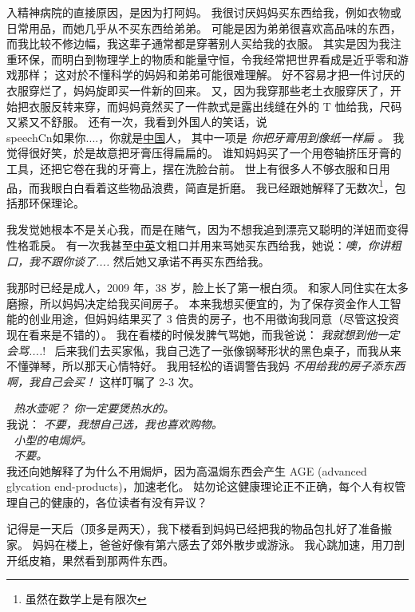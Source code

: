 \documentclass[12pt]{report}
\newcommand{\cc}[2]{#1}
\newcommand{\cc}[2]{#2}
\newcommand{\tab}{\hspace*{1cm}}
\newcommand{\speechCn}[1]{\textrm{\textit{\textcolor{Speech}{#1}}}}
\newcommand*\dashh{\,\,\textemdash\kern-1pt\textemdash\,\,}
\begin{document}
\cc{
入精神病院的直接原因，是因为打阿妈。 我很讨厌妈妈买东西给我，例如衣物或日常用品，而她几乎从不买东西给弟弟。 可能是因为弟弟很喜欢高品味的东西，而我比较不修边幅，我这辈子通常都是穿著别人买给我的衣服。 其实是因为我注重环保，而明白到物理学上的物质和能量守恒，令我经常把世界看成是近乎零和游戏那样； 这对於不懂科学的妈妈和弟弟可能很难理解。 好不容易才把一件讨厌的衣服穿烂了，妈妈旋即买一件新的回来。 又，因为我穿那些老土衣服穿厌了，开始把衣服反转来穿，而妈妈竟然买了一件款式是露出线缝在外的 T 恤给我，尺码又紧又不舒服。 还有一次，我看到外国人的笑话，说 \\speechCn{如果你....，你就是\uline{中国}人}， 其中一项是 \speechCn{你把牙膏用到像纸一样扁 。}  我觉得很好笑，於是故意把牙膏压得扁扁的。 谁知妈妈买了一个用卷轴挤压牙膏的工具，还把它卷在我的牙膏上，摆在洗脸台前。 世上有很多人不够衣服和日用品，而我眼白白看着这些物品浪费，简直是折磨。 我已经跟她解释了无数次\footnote{虽然在数学上是有限次}，包括那环保理论。
}{
	
}

\cc{
我发觉她根本不是关心我，而是在赌气，因为不想我追到漂亮又聪明的洋妞而变得性格乖戾。 有一次我甚至\uline{中英}文粗口并用来骂她买东西给我，她说：\speechCn{噢，你讲粗口，我不跟你谈了....} 然后她又承诺不再买东西给我。
}{
	
}

\cc{
我那时已经是成人，2009 年，38 岁，脸上长了第一根白须。 和家人同住实在太多磨擦，所以妈妈决定给我买间房子。 本来我想买便宜的，为了保存资金作人工智能的创业用途，但妈妈结果买了 3 倍贵的房子，也不用徵询我同意（尽管这投资现在看来是不错的）。 我在看楼的时候发脾气骂她，而我爸说： \speechCn{我就想到他一定会骂....}! \  后来我们去买家俬，我自己选了一张像钢琴形状的黑色桌子，而我从来不懂弹琴，所以那天心情特好。 我用轻松的语调警告我妈 \speechCn{不用给我的房子添东西啊，我自己会买！}  这样叮嘱了 2-3 次。
}{
	
}

\cc{
\tab \dashh \speechCn{热水壶呢？ 你一定要煲热水的。}\\
\tab 我说： \speechCn{不要，我想自己选，我也喜欢购物。} \\
\tab \dashh \speechCn{小型的电焗炉。} \\
\tab \dashh \speechCn{不要。} \\
我还向她解释了为什么不用焗炉，因为高温焗东西会产生 AGE (advanced glycation end-products)，加速老化。 姑勿论这健康理论正不正确，每个人有权管理自己的健康的，各位读者有没有异议？
}{
	
}

\cc{
记得是一天后（顶多是两天），我下楼看到妈妈已经把我的物品包扎好了准备搬家。 妈妈在楼上，爸爸好像有第六感去了郊外散步或游泳。 我心跳加速，用刀剖开纸皮箱，果然看到那两件东西。
}{
	
}
\end{document}
